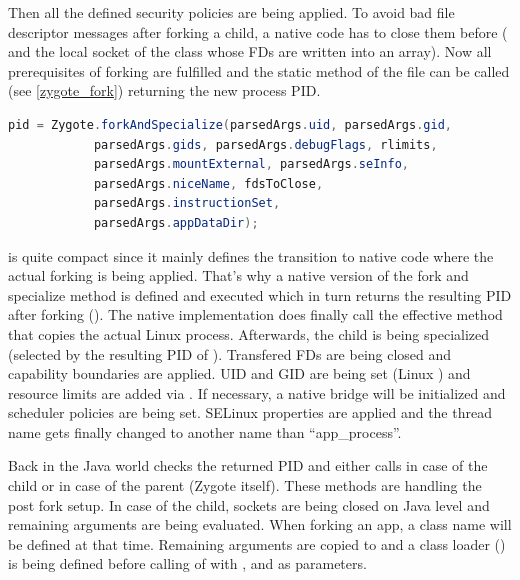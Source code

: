 Then all the defined security policies are being applied. To avoid bad file
descriptor messages after forking a child, a native code has to close them before ( and the local socket  of the
 class whose FDs are written into an 
array).
Now all prerequisites of forking are fulfilled and the static method
 of the  file can be called
(see \autoref{zygote_fork}) returning the new process PID.
\begin{lstlisting}[language=Java, caption=Zygote Fork Call, label=zygote_fork]
pid = Zygote.forkAndSpecialize(parsedArgs.uid, parsedArgs.gid,
            parsedArgs.gids, parsedArgs.debugFlags, rlimits,
            parsedArgs.mountExternal, parsedArgs.seInfo,
            parsedArgs.niceName, fdsToClose,
            parsedArgs.instructionSet,
            parsedArgs.appDataDir);
\end{lstlisting}
 is quite compact since it mainly defines the transition
to native code where the actual forking is being applied. That's why
a native version of the fork and specialize method is defined and executed
which in turn returns the resulting PID after forking
().
The native implementation does finally call the effective  method
that copies the actual Linux process. Afterwards, the child is being
specialized (selected by the resulting PID of ).
Transfered FDs are being closed and capability boundaries are applied.
UID and GID are being set (Linux ) and resource limits are added via .
If necessary, a native bridge will be initialized and scheduler policies
are being set. SELinux properties are applied and the thread name gets finally
changed to another name than ``app\_process''.

Back in the Java world  checks the returned PID and either calls  in case of the child or
 in case of the parent (Zygote itself).
These methods are handling the post fork setup. In case of the child, sockets are being closed on Java level and remaining arguments are being evaluated. When forking an app, a class name will be defined at that time. Remaining arguments are copied to  and a class loader () is being defined before calling  of  with ,  and  as parameters.

